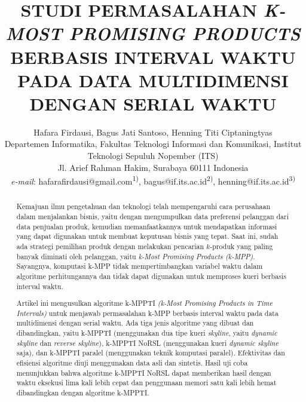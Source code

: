 \documentclass[conference]{IEEEtran}
\begin{document}
\title{STUDI PERMASALAHAN \textit{K-MOST PROMISING PRODUCTS} BERBASIS INTERVAL WAKTU PADA DATA MULTIDIMENSI DENGAN SERIAL WAKTU}
\author{Hafara Firdausi, Bagus Jati Santoso, Henning Titi Ciptaningtyas\\
Departemen Informatika, Fakultas Teknologi Informasi dan Komunikasi, Institut Teknologi Sepuluh Nopember (ITS)\\
Jl. Arief Rahman Hakim, Surabaya 60111 Indonesia\\
\textit{e-mail}: hafarafirdausi@gmail.com\textsuperscript{1)}, bagus@if.its.ac.id\textsuperscript{2)}, henning@if.its.ac.id\textsuperscript{3)}
}

\maketitle

\renewcommand\abstractname{\textit{Abstrak}}
\renewcommand\IEEEkeywordsname{Kata kunci}

\begin{abstract}
Kemajuan ilmu pengetahuan dan teknologi telah mempengaruhi cara perusahaan dalam menjalankan bisnis, yaitu dengan mengumpulkan data preferensi pelanggan dari data penjualan produk, kemudian memanfaatkannya untuk mendapatkan informasi yang dapat digunakan untuk membuat keputusan bisnis yang tepat. Saat ini, sudah ada strategi pemilihan produk dengan melakukan pencarian $k$-produk yang paling banyak diminati oleh pelanggan, yaitu \textit{k-Most Promising Products (k-MPP)}. Sayangnya, komputasi k-MPP tidak mempertimbangkan variabel waktu dalam algoritme perhitungannya dan tidak dapat digunakan untuk memproses kueri berbasis interval waktu.

Artikel ini mengusulkan algoritme k-MPPTI \textit{(k-Most Promising Products in Time Intervals)} untuk menjawab permasalahan k-MPP berbasis interval waktu pada data multidimensi dengan serial waktu. Ada tiga jenis algoritme yang dibuat dan dibandingkan, yaitu k-MPPTI (menggunakan dua tipe kueri \textit{skyline}, yaitu \textit{dynamic skyline} dan \textit{reverse skyline}), k-MPPTI NoRSL (menggunakan kueri \textit{dynamic skyline} saja), dan k-MPPTI paralel (menggunakan teknik komputasi paralel). Efektivitas dan efisiensi algoritme diuji menggunakan data asli dan sintetis. Hasil uji coba menunjukkan bahwa algoritme k-MPPTI NoRSL dapat memberikan hasil dengan waktu eksekusi lima kali lebih cepat dan penggunaan memori satu kali lebih hemat dibandingkan dengan algoritme k-MPPTI.
\end{abstract}
\end{document}
